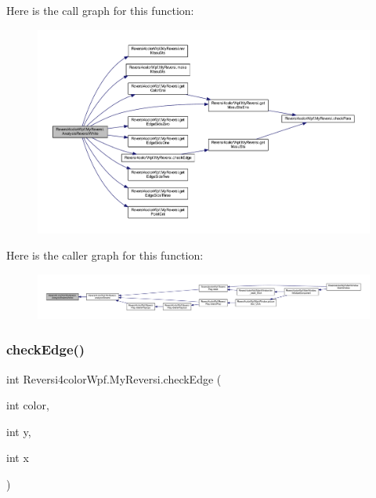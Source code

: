Here is the call graph for this function\+:
\nopagebreak
\begin{figure}[H]
\begin{center}
\leavevmode
\includegraphics[width=350pt]{class_reversi4color_wpf_1_1_my_reversi_a93276b74fb1de8525be31615ff03427e_cgraph}
\end{center}
\end{figure}
Here is the caller graph for this function\+:
\nopagebreak
\begin{figure}[H]
\begin{center}
\leavevmode
\includegraphics[width=350pt]{class_reversi4color_wpf_1_1_my_reversi_a93276b74fb1de8525be31615ff03427e_icgraph}
\end{center}
\end{figure}
\mbox{\label{class_reversi4color_wpf_1_1_my_reversi_abe8314a3a019e857add19ec6bba66781}} 
\subsubsection{\texorpdfstring{check\+Edge()}{checkEdge()}}
{\footnotesize\ttfamily int Reversi4color\+Wpf.\+My\+Reversi.\+check\+Edge (\begin{DoxyParamCaption}\item[{int}]{color,  }\item[{int}]{y,  }\item[{int}]{x }\end{DoxyParamCaption})}



